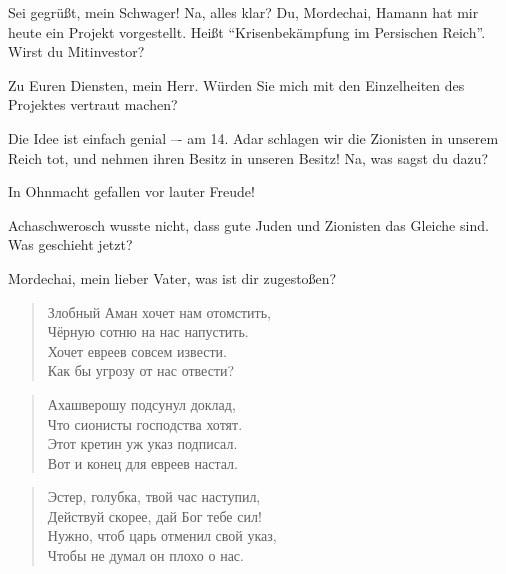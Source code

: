 \documentclass[12pt,a4paper,titlepage]{article}
\begin{document}
\begin{drama}
\scene


\ahspeaks {}
Sei gegrüßt, mein Schwager! Na, alles klar? Du, Mordechai,
Hamann hat mir heute ein Projekt vorgestellt. Heißt
"`Krisenbekämpfung im Persischen Reich"'. Wirst du Mitinvestor?

\mspeaks
Zu Euren Diensten, mein Herr. Würden Sie mich mit den Einzelheiten
des Projektes vertraut machen?

\ahspeaks
Die Idee ist einfach genial –- am 14. Adar schlagen wir die Zionisten
in unserem Reich tot, und nehmen ihren Besitz in unseren Besitz! Na, was sagst du dazu?


\ahspeaks
In Ohnmacht gefallen vor lauter Freude!

\uespeaks
Achaschwerosch wusste nicht, dass gute Juden und Zionisten
das Gleiche sind. Was geschieht jetzt?


\scene


\espeaks
Mordechai, mein lieber Vater, was ist dir zugestoßen?

\mspeaks {}
\begin{verse}
Злобный Аман хочет нам отомстить,\\
Чёрную сотню на нас напустить.\\
Хочет евреев совсем извести.\\
Как бы угрозу от нас отвести?\\
\end{verse}

\begin{verse}
Ахашверошу подсунул доклад,\\
Что сионисты господства хотят.\\
Этот кретин уж указ подписал.\\
Вот и конец для евреев настал.\\
\end{verse}

\begin{verse}
Эстер, голубка, твой час наступил,\\
Действуй скорее, дай Бог тебе сил!\\
Нужно, чтоб царь отменил свой указ,\\
Чтобы не думал он плохо о нас.\\
\end{verse}
              


\end{drama}
\end{document}
